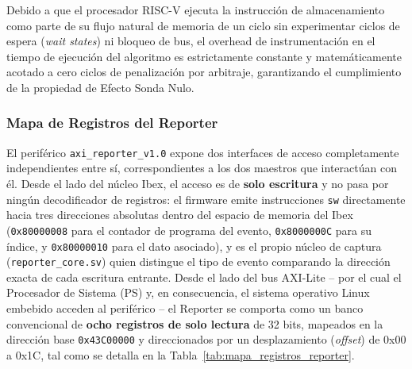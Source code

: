 Debido a que el procesador RISC-V ejecuta la instrucción de almacenamiento como parte de su flujo natural de memoria de un ciclo sin experimentar ciclos de espera (\textit{wait states}) ni bloqueo de bus, el overhead de instrumentación en el tiempo de ejecución del algoritmo es estrictamente constante y matemáticamente acotado a cero ciclos de penalización por arbitraje, garantizando el cumplimiento de la propiedad de Efecto Sonda Nulo.
\subsubsection{Mapa de Registros del Reporter}
El periférico \texttt{axi\_reporter\_v1.0} expone dos interfaces de
acceso completamente independientes entre sí, correspondientes a los dos
maestros que interactúan con él. Desde el lado del núcleo Ibex, el acceso
es de \textbf{solo escritura} y no pasa por ningún decodificador de
registros: el firmware emite instrucciones \texttt{sw} directamente hacia
tres direcciones absolutas dentro del espacio de memoria del Ibex
(\texttt{0x80000008} para el contador de programa del evento,
\texttt{0x8000000C} para su índice, y \texttt{0x80000010} para el dato
asociado), y es el propio núcleo de captura (\texttt{reporter\_core.sv})
quien distingue el tipo de evento comparando la dirección exacta de cada
escritura entrante. Desde el lado del bus AXI-Lite -- por el cual el
Procesador de Sistema (PS) y, en consecuencia, el sistema operativo Linux
embebido acceden al periférico -- el Reporter se comporta como un banco
convencional de \textbf{ocho registros de solo lectura} de 32 bits,
mapeados en la dirección base \texttt{0x43C00000} y direccionados por un
desplazamiento (\textit{offset}) de 0x00 a 0x1C, tal como se detalla en la
Tabla~\ref{tab:mapa_registros_reporter}.

